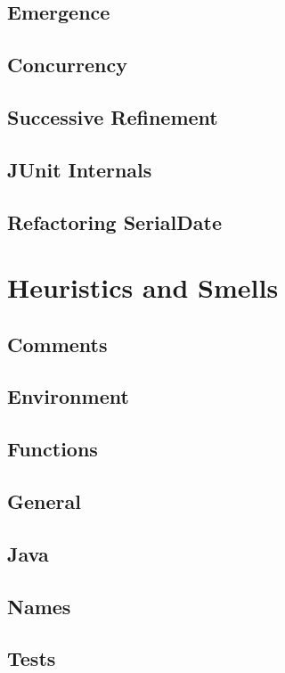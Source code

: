 \documentclass[a4paper, twocolumn]{article}
\begin{document}
\subsection{Emergence}

\subsection{Concurrency}

\subsection{Successive Refinement}

\subsection{JUnit Internals}

\subsection{Refactoring SerialDate}


\section{Heuristics and Smells}

\subsection{Comments}

\subsection{Environment}

\subsection{Functions}

\subsection{General}

\subsection{Java}

\subsection{Names}

\subsection{Tests}
\end{document}
